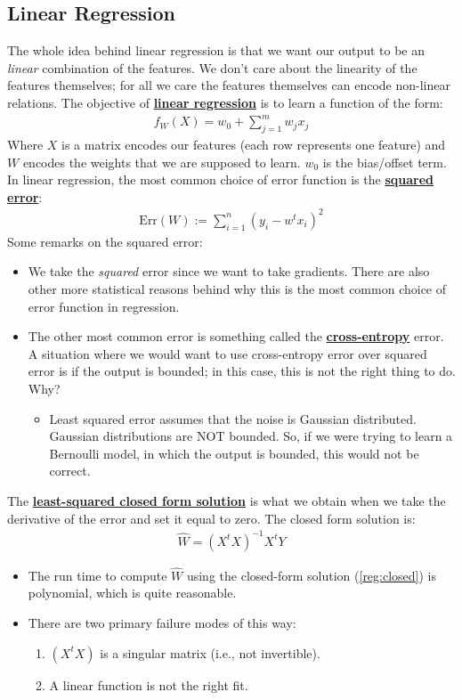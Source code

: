 \documentclass[11pt]{scrartcl}
\theoremstyle{definition}
\theoremstyle{remark}
\newcommand{\dfn}[1]{\textbf{\underline{#1}}}
\begin{document}
\subsection{Linear Regression}
The whole idea behind linear regression is that we want our output to be an \emph{linear} combination of the features. We don't care about the linearity of the features themselves; for all we care the features themselves can encode non-linear relations. The objective of \dfn{linear regression} is to learn a function of the form: 
\begin{align}
	f_W(X) = w_0  + \sum_{j=1}^m w_j x_j
\end{align}
Where $X$ is a matrix encodes our features (each row represents one feature) and $W$ encodes the weights that we are supposed to learn. $w_0$ is the bias/offset term. In linear regression, the most common choice of error function is the \dfn{squared error}: 
\begin{align*}
	\text{Err}(W) := \sum_{i=1}^n (y_i - w^t x_i)^2
\end{align*}
Some remarks on the squared error: 
\begin{itemize}[noitemsep]
	\item We take the \emph{squared} error since we want to take gradients. There are also other more statistical reasons behind why this is the most common choice of error function in regression. 
	\item The other most common error is something called the \dfn{cross-entropy} error. A situation where we would want to use cross-entropy error over squared error is if the output is bounded; in this case, this is not the right thing to do. Why? 
	\begin{itemize}[noitemsep]
		\item Least squared error assumes that the noise is Gaussian distributed. Gaussian distributions are NOT bounded. So, if we were trying to learn a Bernoulli model, in which the output is bounded, this would not be correct. 
	\end{itemize}
\end{itemize}

The \dfn{least-squared closed form solution} is what we obtain when we take the derivative of the error and set it equal to zero. The closed form solution is: 
\begin{align}\label{reg:closed} 
	\hat{W} = (X^t X)^{-1} X^t Y 	
\end{align}
\begin{itemize}[noitemsep]
	\item The run time to compute $\hat{W}$ using the closed-form solution (\ref{reg:closed}) is polynomial, which is quite reasonable.  
	\item There are two primary failure modes of this way: 
	\begin{enumerate}[noitemsep]
		\item $(X^tX)$ is a singular matrix (i.e., not invertible). 
		\item A linear function is not the right fit. 
	\end{enumerate}
\end{itemize}
\end{document}

